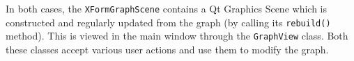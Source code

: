 In both cases, the \texttt{XFormGraphScene} contains a Qt Graphics Scene
which is constructed and regularly updated from the graph (by calling
its \texttt{rebuild()} method). This is viewed in
the main window through the \texttt{GraphView} class. Both these classes
accept various user actions and use them to modify the graph.


